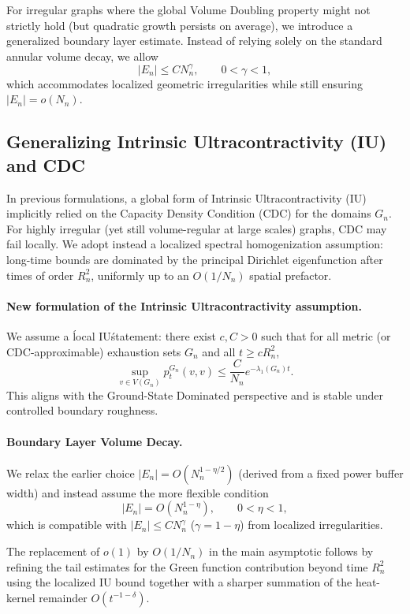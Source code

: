 \documentclass[11pt]{article}
\numberwithin{equation}{section}
\begin{document}
For irregular graphs where the global Volume Doubling property might not strictly hold (but quadratic growth persists on average), we introduce a generalized boundary layer estimate. Instead of relying solely on the standard annular volume decay, we allow
\[
	|E_n| \leq C N_n^{\gamma}, \qquad 0 < \gamma < 1,
\]
which accommodates localized geometric irregularities while still ensuring $|E_n| = o(N_n)$.

\subsection{Generalizing Intrinsic Ultracontractivity (IU) and CDC}

In previous formulations, a global form of Intrinsic Ultracontractivity (IU) implicitly relied on the Capacity Density Condition (CDC) for the domains $G_n$. For highly irregular (yet still volume-regular at large scales) graphs, CDC may fail locally. We adopt instead a localized spectral homogenization assumption: long-time bounds are dominated by the principal Dirichlet eigenfunction after times of order $R_n^2$, uniformly up to an $O(1/N_n)$ spatial prefactor.

\paragraph{New formulation of the Intrinsic Ultracontractivity assumption.}
We assume a \'local IU\' statement: there exist $c, C>0$ such that for all metric (or CDC-approximable) exhaustion sets $G_n$ and all $t \ge c R_n^2$,
\[
	\sup_{v \in V(G_n)} p_t^{G_n}(v,v) \le \frac{C}{N_n} e^{-\lambda_1(G_n) t}.
\]
This aligns with the Ground-State Dominated perspective and is stable under controlled boundary roughness.

\paragraph{Boundary Layer Volume Decay.}
We relax the earlier choice $|E_n|=O(N_n^{1-\eta/2})$ (derived from a fixed power buffer width) and instead assume the more flexible condition
\[
	|E_n| = O(N_n^{1-\eta}), \qquad 0<\eta<1,
\]
which is compatible with $|E_n| \le C N_n^{\gamma}$ ($\gamma = 1-\eta$) from localized irregularities.

The replacement of $o(1)$ by $O(1/N_n)$ in the main asymptotic follows by refining the tail estimates for the Green function contribution beyond time $R_n^2$ using the localized IU bound together with a sharper summation of the heat-kernel remainder $O(t^{-1-\delta})$.
\end{document}
